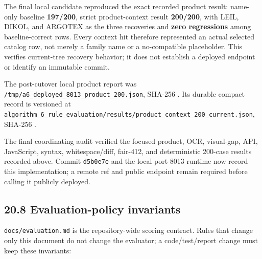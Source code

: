 The final local candidate reproduced the exact recorded product result: name-only baseline \textbf{197/200}, strict product-context result \textbf{200/200}, with LEIL, DIKOL, and ARGOTEX as the three recoveries and \textbf{zero regressions} among baseline-correct rows. Every context hit therefore represented an actual selected catalog row, not merely a family name or a no-compatible placeholder. This verifies current-tree recovery behavior; it does not establish a deployed endpoint or identify an immutable commit.

The post-cutover local product report was \texttt{/tmp/a6\_\allowbreak{}deployed\_\allowbreak{}8013\_\allowbreak{}product\_\allowbreak{}200.json}, SHA-256 \texttt{}. Its durable compact record is versioned at \texttt{algorithm\_\allowbreak{}6\_\allowbreak{}rule\_\allowbreak{}evaluation/results/product\_\allowbreak{}context\_\allowbreak{}200\_\allowbreak{}current.json}, SHA-256 \texttt{}.

The final coordinating audit verified the focused product, OCR, visual-gap, API, JavaScript, syntax, whitespace/diff, fair-412, and deterministic 200-case results recorded above. Commit \texttt{d5b0e7e} and the local port-8013 runtime now record this implementation; a remote ref and public endpoint remain required before calling it publicly deployed.

\subsection{20.8 Evaluation-policy invariants}\label{208-evaluation-policy-invariants}

\texttt{docs/evaluation.md} is the repository-wide scoring contract. Rules that change only this document do not change the evaluator; a code/test/report change must keep these invariants:

